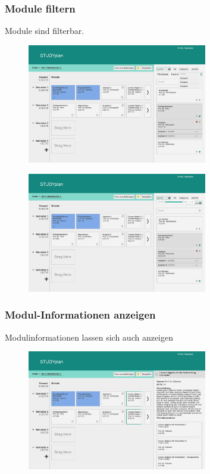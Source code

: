 \subsubsection{Module filtern}
Module sind filterbar.
\begin{figure}[!htb]
	\caption{}
	\label{fig:gui-module-filtern-1}
	\centering
	\includegraphics[width=0.7\textwidth]{../GUI/ergebnisse/module-filtern-1.png}
\end{figure}
\begin{figure}[!htb]
	\caption{}
	\label{fig:gui-module-filtern-2}
	\centering
	\includegraphics[width=0.7\textwidth]{../GUI/ergebnisse/module-filtern-2.png}
\end{figure}

\subsubsection{Modul-Informationen anzeigen}
Modulinformationen lassen sich auch anzeigen
\begin{figure}[!htb]
	\caption{}
	\label{fig:gui-modul-info-1}
	\centering
	\includegraphics[width=0.7\textwidth]{../GUI/ergebnisse/modul-info-1.png}
\end{figure}


